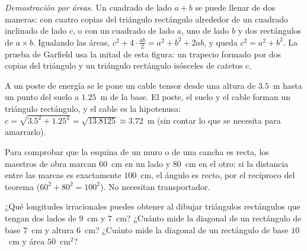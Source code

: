 \documentclass[11pt]{article}
\begin{document}
\emph{Demostración por áreas.} Un cuadrado de lado $a + b$ se puede llenar de dos
maneras: con cuatro copias del triángulo rectángulo alrededor de un cuadrado
inclinado de lado $c$, o con un cuadrado de lado $a$, uno de lado $b$ y dos
rectángulos de $a \times b$. Igualando las áreas,
$c^2 + 4 \cdot \frac{ab}{2} = a^2 + b^2 + 2ab$, y queda $c^2 = a^2 + b^2$. La
prueba de Garfield usa la mitad de esta figura: un trapecio formado por dos copias
del triángulo y un triángulo rectángulo isósceles de catetos $c$.

\begin{center}
\end{center}

\begin{ejemplo}
A un poste de energía se le pone un cable tensor desde una altura de
$\num{3,5}$~m hasta un punto del suelo a $\num{1,25}$~m de la base. El poste, el
suelo y el cable forman un triángulo rectángulo, y el cable es la hipotenusa:
$c = \sqrt{\num{3,5}^2 + \num{1,25}^2} = \sqrt{\num{13,8125}} \approx \num{3,72}$~m
(sin contar lo que se necesita para amarrarlo).
\end{ejemplo}

\begin{aplicacion}
Para comprobar que la esquina de un muro o de una cancha es recta, los maestros de
obra marcan $60$~cm en un lado y $80$~cm en el otro: si la distancia entre las marcas
es exactamente $100$~cm, el ángulo es recto, por el recíproco del teorema
($60^2 + 80^2 = 100^2$). No necesitan transportador.
\end{aplicacion}

\begin{preguntas}
\pregunta ¿Qué longitudes irracionales puedes obtener al dibujar triángulos
rectángulos que tengan dos lados de $9$~cm y $7$~cm?
\espacio{3cm}
\pregunta ¿Cuánto mide la diagonal de un rectángulo de base $7$~cm y altura $6$~cm?
\espacio{2cm}
\pregunta ¿Cuánto mide la diagonal de un rectángulo de base $10$~cm y área $50$~cm$^2$?
\espacio{2.5cm}
\end{preguntas}
\end{document}
